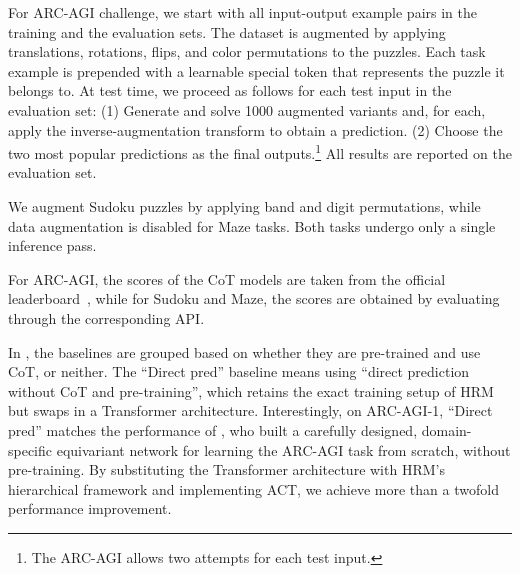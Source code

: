 For ARC-AGI challenge, we start with all input-output example pairs in the training and the evaluation sets. The dataset is augmented by applying translations, rotations, flips, and color permutations to the puzzles. Each task example is prepended with a learnable special token that represents the puzzle it belongs to. At test time, we proceed as follows for each test input in the evaluation set: (1) Generate and solve 1000 augmented variants and, for each, apply the inverse‐augmentation transform to obtain a prediction. (2) Choose the two most popular predictions as the final outputs.\footnote{The ARC-AGI allows two attempts for each test input.} All results are reported on the evaluation set.


We augment Sudoku puzzles by applying band and digit permutations, while data augmentation is disabled for Maze tasks. Both tasks undergo only a single inference pass.

For ARC-AGI, the scores of the CoT models are taken from the official leaderboard~\citep{Chollet2025ARCAGI2AN}, while for Sudoku and Maze, the scores are obtained by evaluating through the corresponding API.


In , the baselines are grouped based on whether they are pre-trained and use CoT, or neither. The ``Direct pred'' baseline means using ``direct prediction without CoT and pre-training'', which retains the exact training setup of HRM but swaps in a Transformer architecture. Interestingly, on ARC-AGI-1, ``Direct pred'' matches the performance of \citet{liao2025arcagiwithoutpretraining}, who built a carefully designed, domain-specific equivariant network for learning the ARC-AGI task from scratch, without pre-training. By substituting the Transformer architecture with HRM's hierarchical framework and implementing ACT, we achieve more than a twofold performance improvement.

